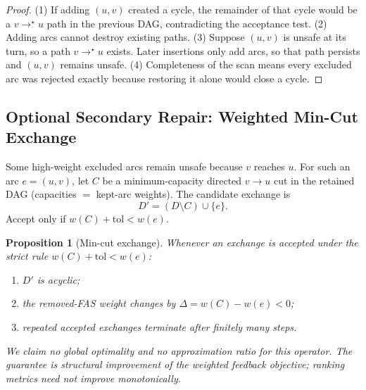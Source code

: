 \documentclass{article}
\newtheorem{proposition}{Proposition}
\begin{document}
\begin{proof}
(1) If adding $(u,v)$ created a cycle, the remainder of that cycle would be a $v\rightarrow^\star u$ path in the previous DAG, contradicting the acceptance test.
(2) Adding arcs cannot destroy existing paths.
(3) Suppose $(u,v)$ is unsafe at its turn, so a path $v\rightarrow^\star u$ exists. Later insertions only add arcs, so that path persists and $(u,v)$ remains unsafe.
(4) Completeness of the scan means every excluded arc was rejected exactly because restoring it alone would close a cycle.
\end{proof}

\subsection{Optional Secondary Repair: Weighted Min-Cut Exchange}
\label{subsec:framework_mincut}
Some high-weight excluded arcs remain unsafe because $v$ reaches $u$. For such an arc $e=(u,v)$, let $C$ be a minimum-capacity directed $v\rightarrow u$ cut in the retained DAG (capacities $=$ kept-arc weights). The candidate exchange is
\[
D'=(D\setminus C)\cup\{e\}.
\]
Accept only if $w(C)+\mathrm{tol}<w(e)$.

\begin{algorithm}[H]
\caption{Conflict-triggered weighted min-cut exchange (optional)}
\label{alg:mincut_exchange}
\end{algorithm}

\begin{proposition}[Min-cut exchange]
\label{prop:mincut}
Whenever an exchange is accepted under the strict rule $w(C)+\mathrm{tol}<w(e)$:
\begin{enumerate}
\item $D'$ is acyclic;
\item the removed-FAS weight changes by $\Delta=w(C)-w(e)<0$;
\item repeated accepted exchanges terminate after finitely many steps.
\end{enumerate}
We claim no global optimality and no approximation ratio for this operator. The guarantee is structural improvement of the weighted feedback objective; ranking metrics need not improve monotonically.
\end{proposition}
\end{document}
